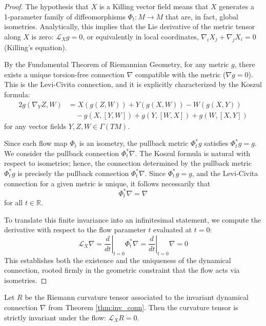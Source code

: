 \begin{proof}
The hypothesis that $X$ is a Killing vector field means that $X$ generates a 1-parameter family of diffeomorphisms $\Phi_t: M \to M$ that are, in fact, global isometries. Analytically, this implies that the Lie derivative of the metric tensor along $X$ is zero: $\mathcal{L}_X g = 0$, or equivalently in local coordinates, $\nabla_i X_j + \nabla_j X_i = 0$ (Killing's equation).

By the Fundamental Theorem of Riemannian Geometry, for any metric $g$, there exists a unique torsion-free connection $\nabla$ compatible with the metric ($\nabla g = 0$). This is the Levi-Civita connection, and it is explicitly characterized by the Koszul formula:
\begin{align*}
2 g(\nabla_Y Z, W) &= X(g(Z, W)) + Y(g(X, W)) - W(g(X, Y)) \\
&\quad - g(X, [Y, W]) + g(Y, [W, X]) + g(W, [X, Y])
\end{align*}
for any vector fields $Y, Z, W \in \Gamma(TM)$.

Since each flow map $\Phi_t$ is an isometry, the pullback metric $\Phi_t^* g$ satisfies $\Phi_t^* g = g$. We consider the pullback connection $\Phi_t^* \nabla$. The Koszul formula is natural with respect to isometries; hence, the connection determined by the pullback metric $\Phi_t^* g$ is precisely the pullback connection $\Phi_t^* \nabla$. Since $\Phi_t^* g = g$, and the Levi-Civita connection for a given metric is unique, it follows necessarily that
\[ \Phi_t^* \nabla = \nabla \]
for all $t \in \mathbb{R}$.

To translate this finite invariance into an infinitesimal statement, we compute the derivative with respect to the flow parameter $t$ evaluated at $t=0$:
\[ \mathcal{L}_X \nabla = \left. \frac{d}{dt} \right|_{t=0} \Phi_t^* \nabla = \left. \frac{d}{dt} \right|_{t=0} \nabla = 0 \]
This establishes both the existence and the uniqueness of the dynamical connection, rooted firmly in the geometric constraint that the flow acts via isometries.
\end{proof}

\begin{lemma}
Let $R$ be the Riemann curvature tensor associated to the invariant dynamical connection $\nabla$ from Theorem \ref{thm:inv_conn}. Then the curvature tensor is strictly invariant under the flow: $\mathcal{L}_X R = 0$.
\end{lemma}

